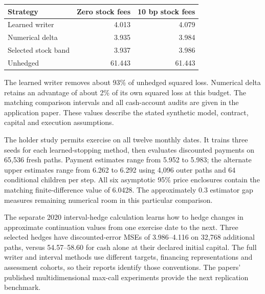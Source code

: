 \documentclass[8pt]{strategynet-journal}
\begin{document}
\begin{SNcolumns}
\begin{center}\begin{minipage}{\linewidth}\centering
\begin{tabular}{lrr}
\toprule
Strategy & Zero stock fees & 10 bp stock fees\\
\midrule
Learned writer & 4.013 & 4.079\\
Numerical delta & 3.935 & 3.984\\
Selected stock band & 3.937 & 3.986\\
Unhedged & 61.443 & 61.443\\
\bottomrule
\end{tabular}
\end{minipage}\end{center}

The learned writer removes about 93\% of unhedged squared loss. Numerical
delta retains an advantage of about 2\% of its own squared loss at this budget.
The matching comparison intervals and all cash-account audits are given in
the application paper. These values describe the stated synthetic model,
contract, capital and execution assumptions.

The holder study permits exercise on all twelve monthly dates. It trains
three seeds for each learned-stopping method, then evaluates discounted
payments on 65,536 fresh paths. Payment estimates range from 5.952 to 5.983;
the alternate upper estimates range from 6.262 to 6.292 using 4,096 outer
paths and 64 conditional children per step. All six asymptotic 95\% price
enclosures contain the matching finite-difference value of 6.0428. The
approximately 0.3 estimator gap measures remaining numerical room in this
particular comparison.

The separate 2020 interval-hedge calculation learns how to hedge changes in
approximate continuation values from one exercise date to the next. Three
selected hedges have discounted-error MSEs of 3.986--4.116 on 32,768 additional
paths, versus 54.57--58.60 for cash alone at their declared initial capital.
The full writer and interval methods use different targets, financing
representations and assessment cohorts, so their reports identify those
conventions. The papers' published multidimensional max-call experiments
provide the next replication benchmark.


\end{SNcolumns}
\end{document}
